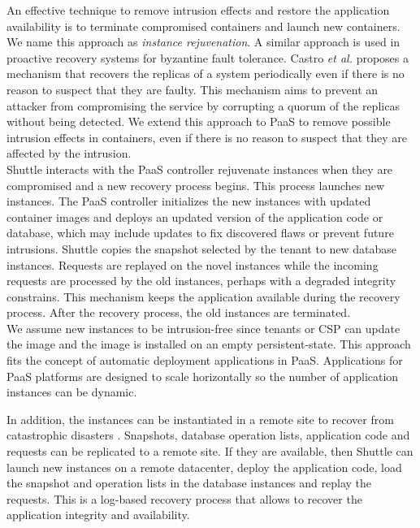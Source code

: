 An effective technique to remove intrusion effects and restore the application availability is to terminate compromised containers and launch new containers. We name this approach as \textit{instance rejuvenation}. A similar approach is used in proactive recovery systems for byzantine fault tolerance. Castro \textit{et al.} \cite{Castro2002} proposes a mechanism that recovers the replicas of a system periodically even if there is no reason to suspect that they are faulty. This mechanism aims to prevent an attacker from compromising the service by corrupting a quorum of the replicas without being detected. We extend this approach to \ac{PaaS} to remove possible intrusion effects in containers, even if there is no reason to suspect that they are affected by the intrusion.\\



Shuttle interacts with the \ac{PaaS} controller rejuvenate instances when they are compromised and a new recovery process begins. This process launches new instances. The \ac{PaaS} controller initializes the new instances with updated container images and deploys an updated version of the application code or database, which may include updates to fix discovered flaws or prevent future intrusions. Shuttle copies the snapshot selected by the tenant to new database instances. Requests are replayed on the novel instances while the incoming requests are processed by the old instances, perhaps with a degraded integrity constrains. This mechanism keeps the application available during the recovery process. After the recovery process, the old instances are terminated.\\

We assume new instances to be intrusion-free since tenants or \acf{CSP} can update the image and the image is installed on an empty persistent-state. This approach fits the concept of automatic deployment applications in \ac{PaaS}. Applications for \ac{PaaS} platforms are designed to scale horizontally so the number of application instances can be dynamic.

In addition, the instances can be instantiated in a remote site to recover from catastrophic disasters \cite{cloud-disaster}. Snapshots, database operation lists, application code and requests can be replicated to a remote site. If they are available, then Shuttle can launch new instances on a remote datacenter, deploy the application code, load the snapshot and operation lists in the database instances and replay the requests. This is a log-based recovery process \cite{Wang2010} that allows to recover the  application integrity and availability.

